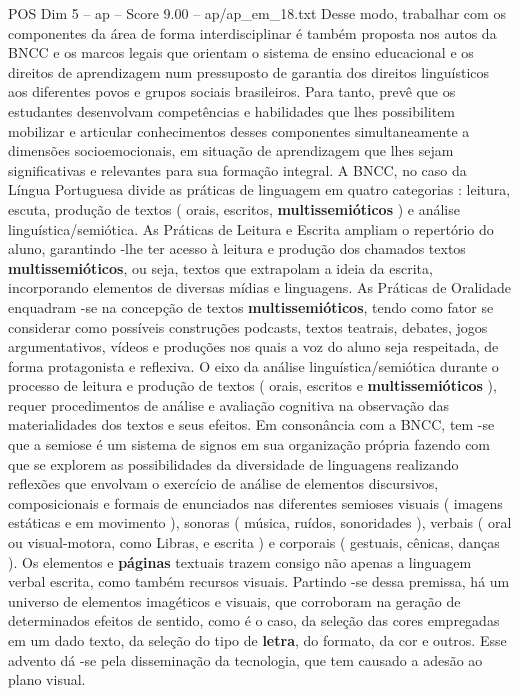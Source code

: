 \begin{textsample}{POS Dim 5 – ap – Score 9.00 – ap/ap\_em\_18.txt}
Desse modo, trabalhar com os componentes da área de forma interdisciplinar é também proposta nos autos da BNCC e os marcos legais que orientam o sistema de ensino educacional e os direitos de aprendizagem num pressuposto de garantia dos direitos linguísticos aos diferentes povos e grupos sociais brasileiros.
Para tanto, prevê que os estudantes desenvolvam competências e habilidades que lhes possibilitem mobilizar e articular conhecimentos desses componentes simultaneamente a dimensões socioemocionais, em situação de aprendizagem que lhes sejam significativas e relevantes para sua formação integral.
A BNCC, no caso da Língua Portuguesa divide as práticas de linguagem em quatro categorias : leitura, escuta, produção de textos ( orais, escritos, \textbf{multissemióticos} ) e análise linguística/semiótica.
As Práticas de Leitura e Escrita ampliam o repertório do aluno, garantindo -lhe ter acesso à leitura e produção dos chamados textos \textbf{multissemióticos}, ou seja, textos que extrapolam a ideia da escrita, incorporando elementos de diversas mídias e linguagens.
As Práticas de Oralidade enquadram -se na concepção de textos \textbf{multissemióticos}, tendo como fator se considerar como possíveis construções podcasts, textos teatrais, debates, jogos argumentativos, vídeos e produções nos quais a voz do aluno seja respeitada, de forma protagonista e reflexiva.
O eixo da análise linguística/semiótica durante o processo de leitura e produção de textos ( orais, escritos e \textbf{multissemióticos} ), requer procedimentos de análise e avaliação cognitiva na observação das materialidades dos textos e seus efeitos.
Em consonância com a BNCC, tem -se que a semiose é um sistema de signos em sua organização própria fazendo com que se explorem as possibilidades da diversidade de linguagens realizando reflexões que envolvam o exercício de análise de elementos discursivos, composicionais e formais de enunciados nas diferentes semioses visuais ( imagens estáticas e em movimento ), sonoras ( música, ruídos, sonoridades ), verbais ( oral ou visual-motora, como Libras, e escrita ) e corporais ( gestuais, cênicas, danças ).
Os elementos e \textbf{páginas} textuais trazem consigo não apenas a linguagem verbal escrita, como também recursos visuais.
Partindo -se dessa premissa, há um universo de elementos imagéticos e visuais, que corroboram na geração de determinados efeitos de sentido, como é o caso, da seleção das cores empregadas em um dado texto, da seleção do tipo de \textbf{letra}, do formato, da cor e outros.
Esse advento dá -se pela disseminação da tecnologia, que tem causado a adesão ao plano visual.

\end{textsample}
